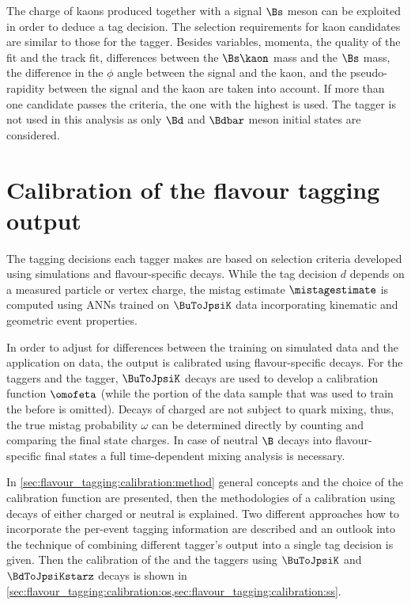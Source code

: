 The charge of kaons produced together with a signal $\Bs$ meson can be exploited
in order to deduce a tag decision. The selection requirements for kaon
candidates are similar to those for the \SSpi tagger. Besides \PID variables,
momenta, the quality of the \IP fit and the track fit, differences between the
$\Bs\kaon$ mass and the $\Bs$ mass, the difference in the $\phi$ angle between
the signal \Bmeson and the kaon, and the pseudo-rapidity between the signal
\Bmeson and the kaon are taken into account. If more than one candidate passes
the criteria, the one with the highest \pT is used. The \SSK tagger is not used
in this analysis as only $\Bd$ and $\Bdbar$ meson initial states are considered.

\section{Calibration of the flavour tagging output}
\label{sec:flavour_tagging:calibration}

The tagging decisions each tagger makes are based on selection criteria
developed using simulations and flavour-specific decays. While the tag decision
$d$ depends on a measured particle or vertex charge, the mistag estimate
$\mistagestimate$ is computed using \acp{ANN} trained on \sweighted $\BuToJpsiK$
data incorporating kinematic and geometric event properties.

In order to adjust for differences between the training on simulated data and
the application on data, the \ANN output is calibrated using flavour-specific
decays. For the \OS taggers and the \SSpi tagger, $\BuToJpsiK$ decays are used
to develop a calibration function $\omofeta$ (while the portion of the data
sample that was used to train the \ANN before is omitted). Decays of charged
\Bmesons are not subject to quark mixing, thus, the true mistag probability
$\omega$ can be determined directly by counting and comparing the final state
charges. In case of neutral $\B$ decays into flavour-specific final states a
full time-dependent mixing analysis is necessary.

In \cref{sec:flavour_tagging:calibration:method} general concepts and the choice
of the calibration function are presented, then the methodologies of a
calibration using decays of either charged or neutral \Bmesons is explained. Two
different approaches how to incorporate the per-event tagging information are
described and an outlook into the technique of combining different tagger's
output into a single tag decision is given. Then the calibration of the \OS and
the \SSpi taggers using $\BuToJpsiK$ and $\BdToJpsiKstarz$ decays is shown in
\cref{sec:flavour_tagging:calibration:os,sec:flavour_tagging:calibration:ss}.

